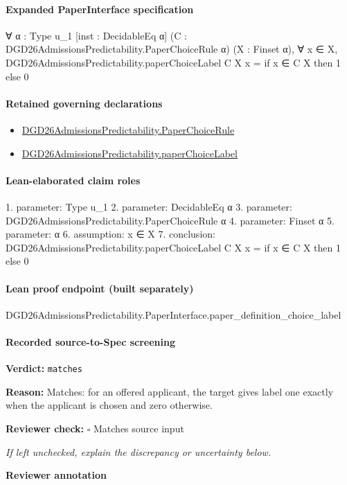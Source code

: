 \documentclass[10pt]{article}
\newcommand{\reviewerbox}{%
  \par\noindent\fbox{\parbox{0.96\linewidth}{\rule{0pt}{0.38in}}}\par
}
\newcommand{\reviewmatch}[1]{%
  \par\noindent\textbf{Reviewer check:} $\square$\; #1\par
  \noindent\emph{If left unchecked, explain the discrepancy or uncertainty below.}\par
}
\begin{document}
\paragraph{Expanded PaperInterface specification}
\begin{ReviewVerbatim}
∀ {α : Type u_1} [inst : DecidableEq α] (C : DGD26AdmissionsPredictability.PaperChoiceRule α) (X : Finset α),
  ∀ x ∈ X, DGD26AdmissionsPredictability.paperChoiceLabel C X x = if x ∈ C X then 1 else 0
\end{ReviewVerbatim}

\paragraph{Retained governing declarations}
\begin{itemize}\raggedright
\item \hyperlink{governing-declaration-4678951b4432b184}{DGD26\allowbreak{}Admissions\allowbreak{}Predictability.\allowbreak{}Paper\allowbreak{}Choice\allowbreak{}Rule}
\item \hyperlink{governing-declaration-0ff059bbe40c2c99}{DGD26\allowbreak{}Admissions\allowbreak{}Predictability.\allowbreak{}paper\allowbreak{}Choice\allowbreak{}Label}
\end{itemize}
\paragraph{Lean-elaborated claim roles}\begin{ReviewVerbatim}
1. parameter: Type u_1
2. parameter: DecidableEq α
3. parameter: DGD26AdmissionsPredictability.PaperChoiceRule α
4. parameter: Finset α
5. parameter: α
6. assumption: x ∈ X
7. conclusion: DGD26AdmissionsPredictability.paperChoiceLabel C X x = if x ∈ C X then 1 else 0
\end{ReviewVerbatim}

\paragraph{Lean proof endpoint (built separately)}\begin{ReviewVerbatim}
DGD26AdmissionsPredictability.PaperInterface.paper_definition_choice_label
\end{ReviewVerbatim}

\paragraph{Recorded source-to-Spec screening}
\textbf{Verdict:} \texttt{matches}
\\
{\raggedright
\textbf{Reason:} Matches:\allowbreak{} for an offered applicant, the target gives label one exactly when the applicant is chosen and zero otherwise.\allowbreak{}
\par}
\reviewmatch{Matches source input}
\noindent\textbf{Reviewer annotation}\par
\reviewerbox
\clearpage
\hypertarget{source-claim-1e70e813c2db1d8e}{}
\end{document}
